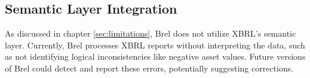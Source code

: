 

\subsection{Semantic Layer Integration}

As discussed in chapter \ref{sec:limitations}, Brel does not utilize XBRL's semantic layer.
Currently, Brel processes XBRL reports without interpreting the data, such as not identifying logical inconsistencies like negative asset values.
Future versions of Brel could 
\textcolor{turkishrose}{detect and report these errors, potentially suggesting corrections}.




